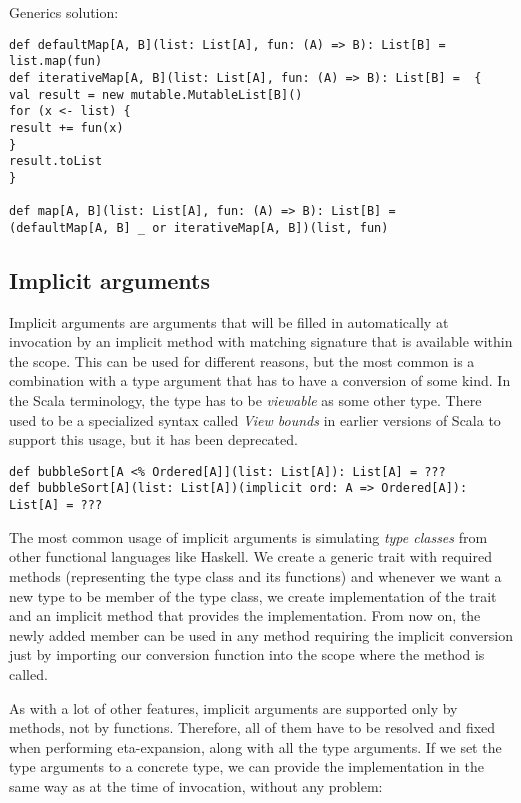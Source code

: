 Generics solution:
\lstset{style=Scala}
\begin{lstlisting}
def defaultMap[A, B](list: List[A], fun: (A) => B): List[B] = 
list.map(fun)
def iterativeMap[A, B](list: List[A], fun: (A) => B): List[B] =  {
val result = new mutable.MutableList[B]()
for (x <- list) {
result += fun(x)
}
result.toList
}

def map[A, B](list: List[A], fun: (A) => B): List[B] = 
(defaultMap[A, B] _ or iterativeMap[A, B])(list, fun)
\end{lstlisting}

\subsection{Implicit arguments}

Implicit arguments are arguments that will be filled in automatically at invocation by an implicit method with matching signature that is available within the scope. This can be used for different reasons, but the most common is a combination with a type argument that has to have a conversion of some kind. In the Scala terminology, the type has to be \textit{viewable} as some other type. There used to be a specialized syntax called \textit{View bounds} in earlier versions of Scala to support this usage, but it has been deprecated.


\lstset{style=Scala}
\begin{lstlisting}
def bubbleSort[A <% Ordered[A]](list: List[A]): List[A] = ???
def bubbleSort[A](list: List[A])(implicit ord: A => Ordered[A]): List[A] = ???
\end{lstlisting}

The most common usage of implicit arguments is simulating \textit{type classes} from other functional languages like Haskell. We create a generic trait with required methods (representing the type class and its functions) and whenever we want a new type to be member of the type class, we create implementation of the trait and an implicit method that provides the implementation. From now on, the newly added member can be used in any method requiring the implicit conversion just by importing our conversion function into the scope where the method is called.


As with a lot of other features, implicit arguments are supported only by methods, not by functions. Therefore, all of them have to be resolved and fixed when performing eta-expansion, along with all the type arguments. If we set the type arguments to a concrete type, we can provide the implementation in the same way as at the time of invocation, without any problem:

